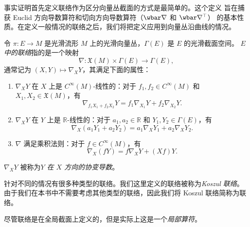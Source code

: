事实证明首先定义联络作为区分向量丛截面的方式是最简单的。这个定义
旨在捕获 Euclid 方向导数算符和切向方向导数算符（$\wbar\nabla$ 和 $\wbar\nabla^\top$）
的基本性质。在定义一般情况的联络之后，我们将把定义应用到向量丛沿曲线的情况。

令 $\pi:E\to M$ 是光滑流形 $M$ 上的光滑向量丛，$\Gamma(E)$ 是 $E$ 的光滑截面空间。
\emph{$E$ 中的联络}指的是一个映射
\[
  \nabla:\mathfrak{X}(M)\times \Gamma(E)\to\Gamma(E),  
\]
通常记为 $(X,Y)\mapsto \nabla_XY$，其满足下面的属性：
\begin{enumerate}
  \item $\nabla_XY$ 在 $X$ 上是 $C^\infty(M)$-线性的：对于
  $f_1,f_2\in C^\infty(M)$ 和 $X_1,X_2\in \mathfrak{X}(M)$，有
  \[
    \nabla_{f_1X_1+f_2X_2}Y=f_1\nabla_{X_1}Y+f_2\nabla_{X_2}Y.  
  \]
  \item $\nabla_XY$ 在 $Y$ 上是 $\mathbb{R}$-线性的：对于
  $a_1,a_2\in \mathbb{R}$ 和 $Y_1,Y_2\in\Gamma(E)$，有
  \[
    \nabla_X(a_1Y_1+a_2Y_2)=a_1\nabla_XY_1+a_2\nabla_XY_2.  
  \]
  \item $\nabla$ 满足乘积法则：对于 $f\in C^\infty(M)$，有
  \[
    \nabla_X(fY)=f\nabla_XY+(Xf)Y.  
  \]
\end{enumerate}
$\nabla_XY$ 被称为\emph{$Y$ 在 $X$ 方向的协变导数}。

针对不同的情况有很多种类型的联络。我们这里定义的联络被称为\emph{Koszul 联络}。
由于我们在本书中不需要考虑其他类型的联络，因此我们将 Koszul 联络简称为联络。

尽管联络是在全局截面上定义的，但是实际上这是一个\emph{局部算符}。

